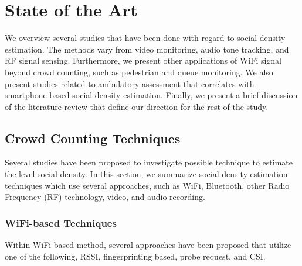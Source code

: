 \chapter{State of the Art}\label{ch:literature-review}

We overview several studies that have been done with regard to social density estimation. The methods vary from video monitoring, audio tone tracking, and \ac{RF} signal sensing. Furthermore, we present other applications of WiFi signal beyond crowd counting, such as pedestrian and queue monitoring. We also present studies related to ambulatory assessment that correlates with smartphone-based social density estimation. Finally, we present a brief discussion of the literature review that define our direction for the rest of the study.



\section{Crowd Counting Techniques} %
\label{sec:crowd_counting_techniques}
Several studies have been proposed to investigate possible technique to estimate the level social density. In this section, we summarize social density estimation techniques which use several approaches, such as WiFi, Bluetooth, other Radio Frequency (\ac{RF}) technology, video, and audio recording.

	\subsection{WiFi-based Techniques} %
	\label{sub:wifi-based-techniques}
	Within WiFi-based method, several approaches have been proposed that utilize one of the following, \ac{RSSI}, fingerprinting based, probe request, and \ac{CSI}.

